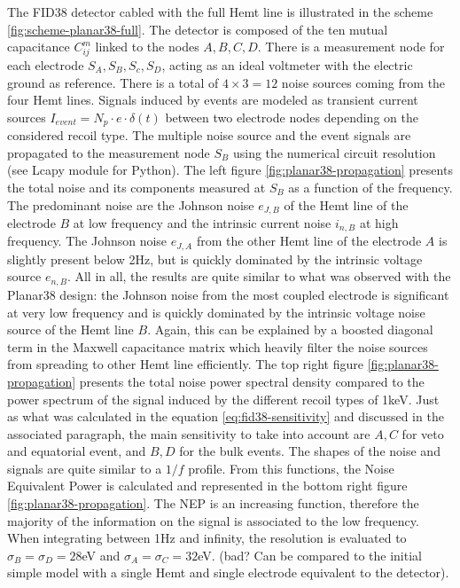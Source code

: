 The FID38 detector cabled with the full Hemt line is illustrated in the scheme \ref{fig:scheme-planar38-full}. The detector is composed of the ten mutual capacitance $C_{ij}^m$ linked to the nodes $A,B,C,D$. There is a measurement node for each electrode $S_A, S_B, S_c, S_D$, acting as an ideal voltmeter with the electric ground as reference. There is a total of $4\times3=12$ noise sources coming from the four Hemt lines. Signals induced by events are modeled as transient current sources $I_{event}=N_p \cdot e \cdot \delta(t)$ between two electrode nodes depending on the considered recoil type. The multiple noise source and the event signals are propagated to the measurement node $S_B$ using the numerical circuit resolution (see Lcapy module for Python).
The left figure \ref{fig:planar38-propagation} presents the total noise and its components measured at $S_B$ as a function of the frequency. The predominant noise are the Johnson noise $e_{J,B}$ of the Hemt line of the electrode $B$ at low frequency and the intrinsic current noise $i_{n,B}$ at high frequency. The Johnson noise $e_{J,A}$ from the other Hemt line of the electrode $A$ is slightly present below 2Hz, but is quickly dominated by the intrinsic voltage source $e_{n,B}$. All in all, the results are quite similar to what was observed with the Planar38 design: the Johnson noise from the most coupled electrode is significant at very low frequency and is quickly dominated by the intrinsic voltage noise source of the Hemt line $B$. Again, this can be explained by a boosted diagonal term in the Maxwell capacitance matrix which heavily filter the noise sources from spreading to other Hemt line efficiently.
The top right figure \ref{fig:planar38-propagation} presents the total noise power spectral density compared to the power spectrum of the signal induced by the different recoil types of 1keV. Just as what was calculated in the equation \ref{eq:fid38-sensitivity} and discussed in the associated paragraph, the main sensitivity to take into account are $A,C$ for veto and equatorial event, and $B,D$ for the bulk events. The shapes of the noise and signals are quite similar to a $1/f$ profile. From this functions, the Noise Equivalent Power is calculated and represented in the bottom right figure \ref{fig:planar38-propagation}. The NEP is an increasing function, therefore the majority of the information on the signal is associated to the low frequency. When integrating between 1Hz and infinity, the resolution is evaluated to $\sigma_B=\sigma_D=28$eV and $\sigma_A=\sigma_C=32$eV. (bad? Can be compared to the initial simple model with a single Hemt and single electrode equivalent to the detector).

